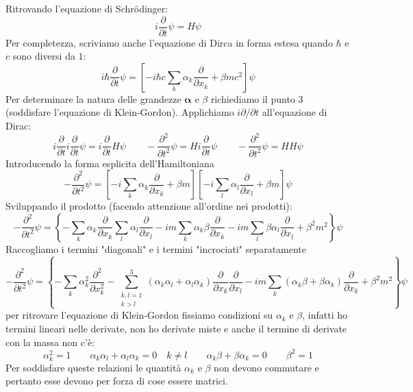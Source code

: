 Ritrovando l'equazione di Schr\"odinger:
\begin{equation*}
    i\frac{\partial }{\partial t}\psi=H\psi
\end{equation*}
Per completezza, scriviamo anche l'equazione di Dirca in forma estesa quando $\hbar$ e $c$ sono diversi da $1$:
\begin{equation}
    i\hbar \frac{\partial}{\partial t} \psi=\left[-i\hbar c \sum_k \alpha_k \frac{\partial}{\partial x_k}+\beta mc^2\right] \psi
\end{equation}
Per determinare la natura delle grandezze $\boldsymbol{\alpha}$ e $\beta$ richiediamo il punto $3$ (soddisfare l'equazione di Klein-Gordon). Applichiamo $i\partial/\partial t$ all'equazione di Dirac:
\begin{equation*}
    i \frac{\partial}{\partial t} i \frac{\partial}{\partial t} \psi = i \frac{\partial}{\partial t} H \psi \qquad -\frac{\partial^2}{\partial t^2} \psi = H i \frac{\partial}{\partial t} \psi \qquad -\frac{\partial^2}{\partial t^2} \psi = H H \psi
\end{equation*}
Introducendo la forma esplicita dell'Hamiltoniana
$$
-\frac{\partial^2}{\partial t^2}\psi = \left[ -i \sum_k \alpha_k \frac{\partial}{\partial x_k} + \beta m \right] \left[ -i \sum_l \alpha_l \frac{\partial}{\partial x_l} + \beta m \right] \psi
$$
Sviluppando il prodotto (facendo attenzione all'ordine nei prodotti):
$$
-\frac{\partial^2}{\partial t^2}\psi = \left\{ -\sum_k \alpha_k \frac{\partial}{\partial x_k} \sum_l\alpha_l \frac{\partial}{\partial x_l} - i m \sum_k \alpha_k \beta \frac{\partial}{\partial x_k} - i m \sum_l \beta \alpha_l \frac{\partial}{\partial x_l} + \beta^2 m^2 \right\} \psi
$$
Raccogliamo i termini "diagonali" e i termini "incrociati" separatamente
$$
-\frac{\partial^2}{\partial t^2}\psi = \left\{ -\sum_k \alpha_k^2 \frac{\partial^2}{\partial x_k^2} -\sum_{\substack{k,l=1 \\ k>l}}^3 (\alpha_k \alpha_l + \alpha_l \alpha_k) \frac{\partial}{\partial x_k} \frac{\partial}{\partial x_l} - i m \sum_k (\alpha_k \beta + \beta \alpha_k) \frac{\partial}{\partial x_k} + \beta^2 m^2 \right\} \psi
$$
per ritrovare l'equazione di Klein-Gordon fissiamo condizioni su $\alpha_k$ e $\beta$, infatti ho termini lineari nelle derivate, non ho derivate miste e anche il termine di derivate con la massa non c'è:
$$
\alpha_k^2 = 1 \qquad \alpha_k \alpha_l + \alpha_l \alpha_k = 0 \quad k \ne l \qquad \alpha_k \beta + \beta \alpha_k = 0 \qquad \beta^2 = 1
$$
Per soddisfare queste relazioni le quantità $\alpha_k$ e $\beta$ non devono commutare e pertanto esse devono per forza di cose essere matrici.
